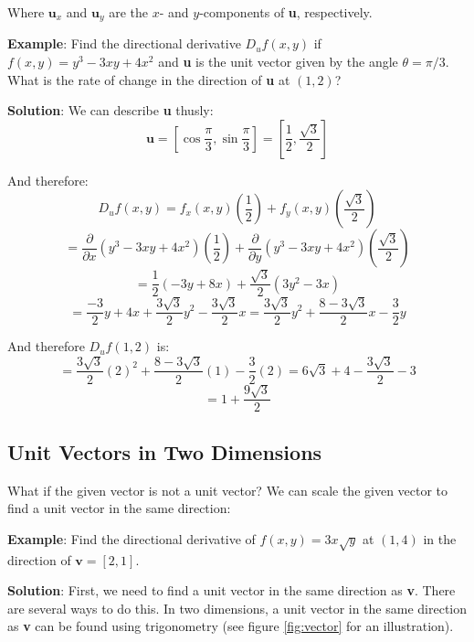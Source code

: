 Where $\textbf{u}_x$ and $\textbf{u}_y$ are the $x$- and $y$-components of 
\textbf{u}, respectively. 

\textbf{Example}: Find the directional derivative $D_u f(x, y)$ if $f(x, y) = 
y^3 - 3xy + 4x^2$ and \textbf{u} is the unit vector given by the angle $\theta 
= \pi/3$. What is the rate of change in the direction of \textbf{u} at $(1, 2)$?

\textbf{Solution}: We can describe \textbf{u} thusly:
$$\textbf{u} = \left[ \cos{ \frac{\pi}{3} }, \sin{ \frac{\pi}{3}} \right] = 
\left[ \frac{1}{2}, \frac{\sqrt{3}}{2} \right]$$

And therefore:
$$D_u f(x, y) = f_x(x, y) \left( \frac{1}{2} \right) + f_y(x, y) \left( \frac{
\sqrt{3}}{2} \right) $$
$$= \frac{\partial}{\partial x} \left( y^3 - 3xy + 4x^2 \right) \left( 
\frac{1}{2} \right) + \frac{\partial}{\partial y} \left( y^3 - 3xy + 4x^2 
\right) \left( \frac{\sqrt{3}}{2} \right)$$
$$= \frac{1}{2} \left( -3y + 8x \right) + \frac{\sqrt{3}}{2} \left( 3y^2 - 3x 
\right)$$
$$= \frac{-3}{2}y + 4x + \frac{3\sqrt{3}}{2}y^2 - \frac{3\sqrt{3}}{2}x = \frac{
3\sqrt{3}}{2}y^2 + \frac{8-3\sqrt{3}}{2}x - \frac{3}{2}y$$

And therefore $D_u f(1, 2)$ is:
$$= \frac{3\sqrt{3}}{2} \left( 2 \right)^2 + \frac{8 - 3\sqrt{3}}{2} \left( 1 
\right) - \frac{3}{2} \left( 2 \right) = 6\sqrt{3} + 4 - \frac{3\sqrt{3}}{2} - 
3$$
$$= 1 + \frac{9\sqrt{3}}{2}$$

\subsection{Unit Vectors in Two Dimensions}

What if the given vector is not a unit vector? We can scale the given vector 
to find a unit vector in the same direction:

\textbf{Example}: Find the directional derivative of $f(x, y) = 3x\sqrt{y}$ 
at $(1, 4)$ in the direction of $\textbf{v} = \left[2, 1 \right]$.

\textbf{Solution}: First, we need to find a unit vector in the same direction 
as \textbf{v}. There are several ways to do this. In two dimensions, a unit 
vector in the same direction as \textbf{v} can be found using trigonometry 
(see figure \ref{fig:vector} for an illustration). 

